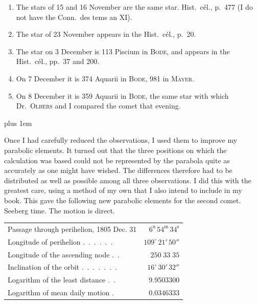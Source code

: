 \begin{enumerate}
\item[1)] The stars of 15 and 16 November are the same star. Hist.\ cél., p.\ 477 (I do not have the Conn.\ des tems an XI).
\item[2)] The star of 23 November appears in the Hist.\ cél., p.\ 20.
\item[3)] The star on 3 December is 113 Piscium in \textsc{Bode}, and appears in the Hist.\ cél., pp.\ 37 and 200.
\item[4)] On 7 December it is 374 Aquarii in \textsc{Bode}, 981 in \textsc{Mayer}.
\item[5)] On 8 December it is 359 Aquarii in \textsc{Bode}, the same star with which Dr.\ \textsc{Olbers} and I compared the comet that evening.
\end{enumerate}

{\rightskip=0pt plus 1em
\par\indent Once I had carefully reduced the observations, I used them to improve my parabolic elements. It turned out that the three positions on which the calculation was based could not be represented by the parabola quite as accurately as one might have wished. The differences therefore had to be distributed as well as possible among all three observations. I did this with the greatest care, using a method of my own that I also intend to include in my book. This gave the following new parabolic elements for the second comet. Seeberg time. The motion is direct.\par}



\begin{center}\begingroup
\fontsize{9}{11}\selectfont
\setlength{\tabcolsep}{2pt}\renewcommand{\arraystretch}{1.12}
\begin{tabular}{lr}
Passage through perihelion, 1805 Dec. 31 & $6^{\mathrm{u}}\,54^{\mathrm{m}}\,34^{\mathrm{s}}$ \\
Longitude of perihelion .\ .\ .\ .\ .\ . & $109^{\circ}\,21'\,50''$ \\
Longitude of the ascending node .\ . & $250\;33\;35$ \\
Inclination of the orbit .\ .\ .\ .\ .\ .\ . & $16^{\circ}\,30'\,32''$ \\
Logarithm of the least distance .\ . & 9.9503300 \\
Logarithm of mean daily motion . & 0.0346333 \\
\end{tabular}\endgroup\end{center}



